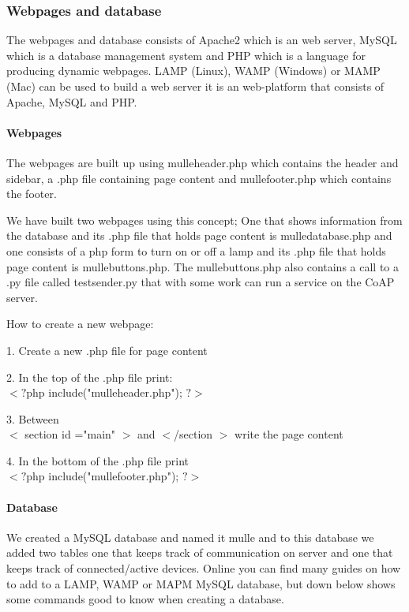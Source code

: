 \subsubsection{Webpages and database}
 
The webpages and database consists of Apache2 which is an web server, MySQL which is a database management system and PHP which is a language for producing dynamic webpages.
LAMP (Linux), WAMP (Windows) or MAMP (Mac) can be used to build a web server it is an web-platform that consists of Apache, MySQL and PHP.

\paragraph{Webpages}

The webpages are built up using mulleheader.php which contains the header and sidebar, a .php file containing page content and mullefooter.php which contains the footer.

We have built two webpages using this concept; One that shows information from the database and its .php file that holds page content is mulledatabase.php and one consists of 
a php form to turn on or off a lamp and its .php file that holds page content is mullebuttons.php. The mullebuttons.php also contains a call to a .py file called testsender.py
that with some work can run a service on the CoAP server.


How to create a new webpage:

1. 	Create a new .php file for page content

2. 	In the top of the .php file print:\\$<?$php include("mulleheader.php"); $?>$

3. 	Between \\$<$ section id ="main" $>$ and $<$/section $>$ write the page content

4. 	In the bottom of the .php file print \\$<?$php include("mullefooter.php"); $?>$

\paragraph{Database}

We created a MySQL database and named it mulle and to this database we added two tables one that keeps track of communication on server and one that keeps track of connected/active 
devices. Online you can find many guides on how to add to a LAMP, WAMP or MAPM MySQL database, but down below shows some commands good to know when creating a database.  


